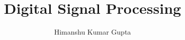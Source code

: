 \documentclass[journal,12pt,twocolumn]{IEEEtran}
\begin{document}
\let\StandardTheFigure\thefigure
\renewcommand{\thefigure}{\theproblem}



\def\putbox#1#2#3{\makebox[0in][l]{\makebox[#1][l]{}\raisebox{\baselineskip}[0in][0in]{\raisebox{#2}[0in][0in]{#3}}}}
     \def\rightbox#1{\makebox[0in][r]{#1}}
     \def\centbox#1{\makebox[0in]{#1}}
     \def\topbox#1{\raisebox{-\baselineskip}[0in][0in]{#1}}
     \def\midbox#1{\raisebox{-0.5\baselineskip}[0in][0in]{#1}}

\vspace{3cm}

\title{
Digital Signal Processing
}


%
%
%

\author{ Himanshu Kumar Gupta%
	
}
% 
%
\end{document}
